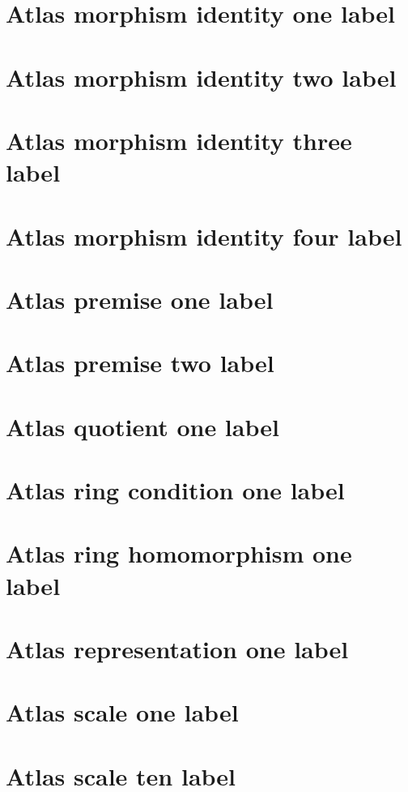 \documentclass[11pt]{article}
\theoremstyle{definition}
\begin{document}
\section{Atlas morphism identity one label}
\label{ll:labels:atlas-m1}
\section{Atlas morphism identity two label}
\label{ll:labels:atlas-m2}
\section{Atlas morphism identity three label}
\label{ll:labels:atlas-m3}
\section{Atlas morphism identity four label}
\label{ll:labels:atlas-m4}
\section{Atlas premise one label}
\label{ll:labels:atlas-p1}
\section{Atlas premise two label}
\label{ll:labels:atlas-p2}
\section{Atlas quotient one label}
\label{ll:labels:atlas-ql1}
\section{Atlas ring condition one label}
\label{ll:labels:atlas-rc1}
\section{Atlas ring homomorphism one label}
\label{ll:labels:atlas-rh1}
\section{Atlas representation one label}
\label{ll:labels:atlas-rp1}
\section{Atlas scale one label}
\label{ll:labels:atlas-s1}
\section{Atlas scale ten label}
\label{ll:labels:atlas-s10}
\end{document}
